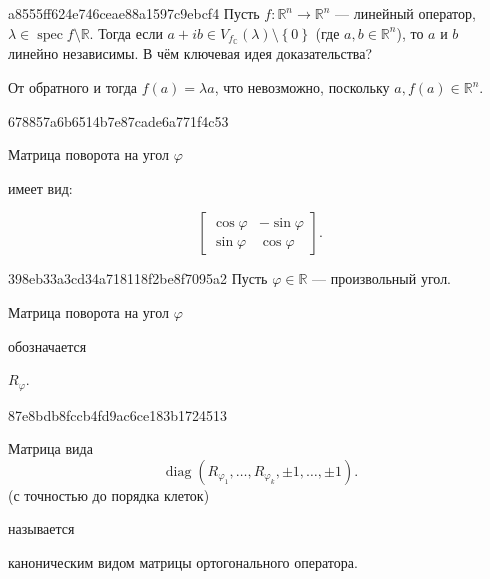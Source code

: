 \begin{note}{a8555ff624e746ceae88a1597c9ebcf4}
    Пусть \({ f : \mathbb R^{n} \to \mathbb R^{n} }\) --- линейный оператор,\: \({ \lambda \in \operatorname{spec} f \setminus \mathbb R }\).
    Тогда если \({ a + ib \in V_{f_{\mathbb C}}(\lambda) \setminus \left\{ 0 \right\} }\) (где \({ a, b \in \mathbb R^{n} }\)), то \({ a }\) и \({ b }\) линейно независимы.
    В чём ключевая идея доказательства?

    \begin{cloze}{1}
        От обратного и тогда \({ f(a) = \lambda a }\), что невозможно, поскольку \({ a, f(a) \in \mathbb R^{n} }\).
    \end{cloze}
\end{note}

\begin{note}{678857a6b6514b7e87cade6a771f4c53}
    \begin{icloze}{2}Матрица поворота на угол \({ \varphi }\)\end{icloze} имеет вид:
    \begin{icloze}{1}
        \[
            \begin{bmatrix}
                \cos \varphi & -\sin \varphi \\
                \sin \varphi & \cos \varphi
            \end{bmatrix}.
        \]
    \end{icloze}
\end{note}

\begin{note}{398eb33a3cd34a718118f2be8f7095a2}
    Пусть \({ \varphi \in \mathbb R }\) --- произвольный угол.
    \begin{icloze}{1}Матрица поворота на угол \({ \varphi }\)\end{icloze} обозначается \begin{icloze}{2}\({ R_{\varphi} }\).\end{icloze}
\end{note}

\begin{note}{87e8bdb8fccb4fd9ac6ce183b1724513}
    \begin{icloze}{1}
        Матрица вида
        \[
            \operatorname{diag}(R_{\varphi_1}, \ldots, R_{\varphi_k}, \pm 1, \ldots, \pm 1).
        \]
    (с точностью до порядка клеток)
    \end{icloze}
    называется \begin{icloze}{2}каноническим видом матрицы ортогонального оператора.\end{icloze}
\end{note}

